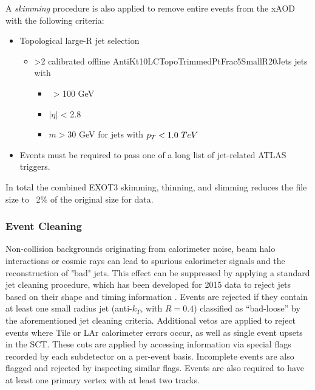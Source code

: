 A \textit{skimming} procedure is also applied to remove entire events from the xAOD with the following criteria:
\begin{itemize}

    \item Topological large-R jet selection
        \begin{itemize}
            \item >2 calibrated offline AntiKt10LCTopoTrimmedPtFrac5SmallR20Jets jets with
                \begin{itemize}
                    \item \pt\ > 100 GeV
                    \item $|\eta|$ < 2.8
                    \item $m > 30$ GeV for jets with $\pt < 1.0\ TeV$
                \end{itemize}
        \end{itemize}
    \item Events must be required to pass one of a long list of jet-related ATLAS triggers.
\end{itemize}

In total the combined EXOT3 skimming, thinning, and slimming reduces the file size to ~2\% of the original size for data.

\subsubsection{Event Cleaning}
\label{subsec:evtclean}
Non-collision backgrounds originating from calorimeter noise, beam halo interactions or cosmic rays can lead to spurious calorimeter signals and the reconstruction of "bad" jets. This effect can be suppressed by applying a standard jet cleaning procedure, which has been developed for 2015 data to reject jets based on their shape and timing information \cite{jetSelection} . Events are rejected if they contain at least one small radius jet (anti-$k_T$, with $R=0.4$) classified as ``bad-loose'' by the aforementioned jet cleaning criteria.
Additional vetos are applied to reject events where Tile or LAr calorimeter errors occur, as well as single event upsets in the SCT. These cuts are applied by accessing information via special flags recorded by each subdetector on a per-event basis. Incomplete events are also flagged and rejected by inspecting similar flags.
Events are also required to have at least one primary vertex with at least two tracks.

